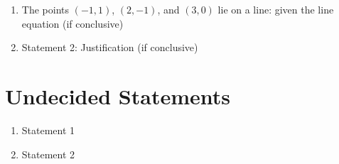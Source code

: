 \documentclass{article}
\begin{document}
\begin{enumerate}
    \item The points $(-1,1)$, $(2,-1)$, and $(3,0)$ lie on a line: given the line equation  (if conclusive)
    \item Statement 2: Justification (if conclusive)
\end{enumerate}

\section{Undecided Statements}

\begin{enumerate}
    \item Statement 1
    \item Statement 2
\end{enumerate}
\end{document}
